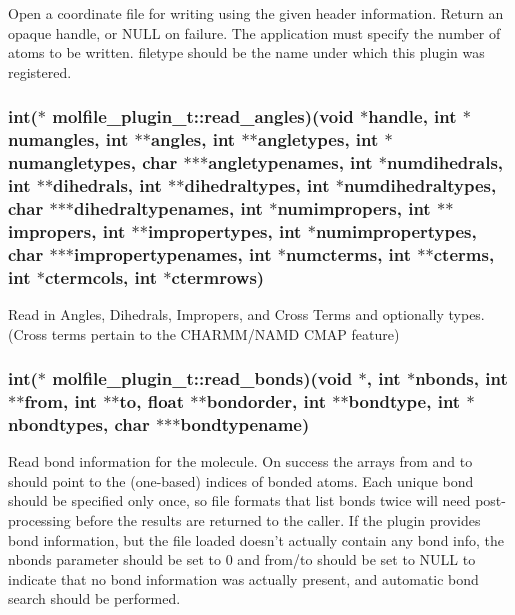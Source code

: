 \-Open a coordinate file for writing using the given header information. \-Return an opaque handle, or \-N\-U\-L\-L on failure. \-The application must specify the number of atoms to be written. filetype should be the name under which this plugin was registered. \hypertarget{structmolfile__plugin__t_a4c8cf13d21a1d738a405e208cbe46a78}{
\subsubsection[{read\-\_\-angles}]{\setlength{\rightskip}{0pt plus 5cm}int($\ast$  {\bf molfile\-\_\-plugin\-\_\-t\-::read\-\_\-angles})({\bf void} $\ast$handle, int $\ast$numangles, int $\ast$$\ast${\bf angles}, int $\ast$$\ast$angletypes, int $\ast$numangletypes, char $\ast$$\ast$$\ast$angletypenames, int $\ast$numdihedrals, int $\ast$$\ast$dihedrals, int $\ast$$\ast$dihedraltypes, int $\ast$numdihedraltypes, char $\ast$$\ast$$\ast$dihedraltypenames, int $\ast$numimpropers, int $\ast$$\ast$impropers, int $\ast$$\ast$impropertypes, int $\ast$numimpropertypes, char $\ast$$\ast$$\ast$impropertypenames, int $\ast$numcterms, int $\ast$$\ast$cterms, int $\ast$ctermcols, int $\ast$ctermrows)}}\label{structmolfile__plugin__t_a4c8cf13d21a1d738a405e208cbe46a78}
\-Read in \-Angles, \-Dihedrals, \-Impropers, and \-Cross \-Terms and optionally types. (\-Cross terms pertain to the \-C\-H\-A\-R\-M\-M/\-N\-A\-M\-D \-C\-M\-A\-P feature) \hypertarget{structmolfile__plugin__t_a6e1aca38d75aacb2cbcf6401261cdb5f}{
\subsubsection[{read\-\_\-bonds}]{\setlength{\rightskip}{0pt plus 5cm}int($\ast$ {\bf molfile\-\_\-plugin\-\_\-t\-::read\-\_\-bonds})({\bf void} $\ast$, int $\ast$nbonds, int $\ast$$\ast$from, int $\ast$$\ast$to, float $\ast$$\ast$bondorder, int $\ast$$\ast$bondtype, int $\ast$nbondtypes, char $\ast$$\ast$$\ast$bondtypename)}}\label{structmolfile__plugin__t_a6e1aca38d75aacb2cbcf6401261cdb5f}
\-Read bond information for the molecule. \-On success the arrays from and to should point to the (one-\/based) indices of bonded atoms. \-Each unique bond should be specified only once, so file formats that list bonds twice will need post-\/processing before the results are returned to the caller. \-If the plugin provides bond information, but the file loaded doesn't actually contain any bond info, the nbonds parameter should be set to 0 and from/to should be set to \-N\-U\-L\-L to indicate that no bond information was actually present, and automatic bond search should be performed.

